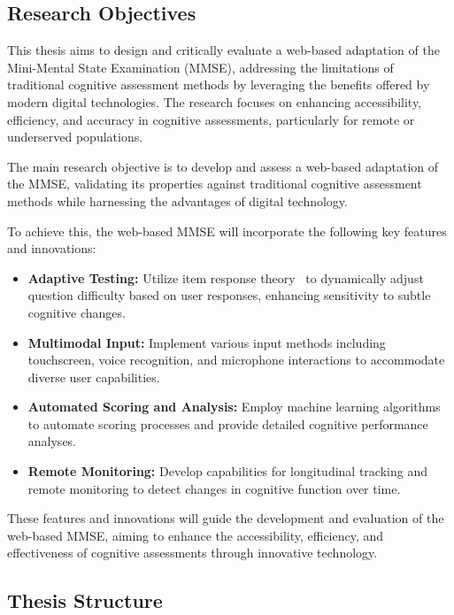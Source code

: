 \subsection{Research Objectives}

This thesis aims to design and critically evaluate a web-based adaptation of the Mini-Mental State Examination (MMSE), addressing the limitations of traditional cognitive assessment methods by leveraging the benefits offered by modern digital technologies. The research focuses on enhancing accessibility, efficiency, and accuracy in cognitive assessments, particularly for remote or underserved populations.

The main research objective is to develop and assess a web-based adaptation of the MMSE, validating its properties against traditional cognitive assessment methods while harnessing the advantages of digital technology.

To achieve this, the web-based MMSE will incorporate the following key features and innovations:

\begin{itemize}
    \item \textbf{Adaptive Testing:} Utilize item response theory~\cite{embretson2013item} to dynamically adjust question difficulty based on user responses, enhancing sensitivity to subtle cognitive changes.
    
    \item \textbf{Multimodal Input:} Implement various input methods including touchscreen, voice recognition, and microphone interactions to accommodate diverse user capabilities.
    
    \item \textbf{Automated Scoring and Analysis:} Employ machine learning algorithms~\cite{shatte2019machine} to automate scoring processes and provide detailed cognitive performance analyses.
    
    \item \textbf{Remote Monitoring:} Develop capabilities for longitudinal tracking and remote monitoring to detect changes in cognitive function over time.
\end{itemize}

These features and innovations will guide the development and evaluation of the web-based MMSE, aiming to enhance the accessibility, efficiency, and effectiveness of cognitive assessments through innovative technology.

\subsection{Thesis Structure}


